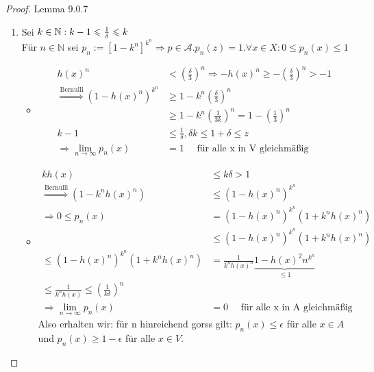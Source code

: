 \begin{proof}{Lemma 9.0.7}
\begin{enumerate}
        \item[(2.)] Sei $k \in \mathbb{N} : k-1 \leqslant \frac{1}{\delta} \leqslant k$\\
    Für $n \in \mathbb{N}$ sei $p_n:=[1-k^n]^{k^n} \Rightarrow p \in \mathcal{A}. p_n(z) = 1. \forall x \in X:0\leq p_n(x)\leq 1$
    \begin{itemize}
        \item[$x \in A$:]
        \begin{equation*}
            \begin{split}
                h(x)^n & < (\frac{\delta}{3})^n \Rightarrow -h(x)^n \geq -(\frac{\delta}{3})^n > -1\\
                \overset{\text{Bernulli}}{\Rightarrow} (1-h(x)^n)^{k^n} 
                &\geq 1-k^n(\frac{\delta}{3})^n \\
                &\geq 1-k^n(\frac{1}{3k})^n = 1-(\frac{1}{3})^n\\
                k-1 &\leq \frac{1}{\delta}, \delta k \leq 1+\delta \leq z\\
                \Rightarrow \lim_{n\to\infty} p_n(x) &= 1 \quad \text{ für alle x in V gleichmäßig}
            \end{split}
        \end{equation*}
        \item[$x \in V$:]
        \begin{equation*}
            \begin{split}
                k h(x) &\leq k \delta > 1\\
                \overset{\text{Bernulli}}{\Rightarrow} (1-k^n h(x)^n) &\leq (1-h(x)^n)^{k^n} \\
                \Rightarrow 0 \leq p_n(x) &= (1-h(x)^n)^{k^n} (1+k^n h(x)^n)\\
                &\leq (1-h(x)^n)^{k^n}(1+k^n h(x)^n)\\
                \leq (1-h(x)^n)^{k^n}(1+k^n h(x)^n) &= \frac{1}{k^n h(x)^n} 
                \underbrace{1-h(x)^2n^{k^n}}_{\leq 1}\\
                \leq \frac{1}{k^nh(x)} \leq (\frac{1}{k \delta})^n\\
                \Rightarrow \lim_{n\to\infty} p_n(x) &= 0 \quad \text{ für alle x in A gleichmäßig}
            \end{split}
        \end{equation*}
        Also erhalten wir: für n hinreichend gorss gilt: $p_n(x) \leq \epsilon$ für alle $x \in A$ 
        und $p_n(x) \geq 1-\epsilon$ für alle $x \in V$. \\

\end{itemize}
\end{enumerate}
\end{proof}
